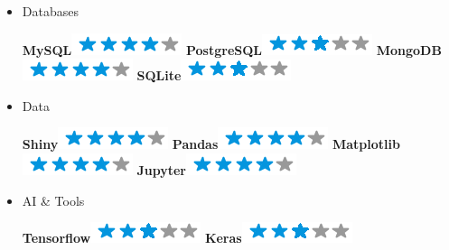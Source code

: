 \documentclass[]{friggeri-cv}
\begin{document}
\begin{flushright}
\begin{multicols}{3}
\begin{itemize}
\columnbreak
\item Databases \
\begin{flushright}

\textbf{MySQL}\includegraphics[scale=0.40]{res/img/4stars.png}
\textbf{PostgreSQL}\includegraphics[scale=0.40]{res/img/3stars.png}
\textbf{MongoDB}\includegraphics[scale=0.40]{res/img/4stars.png}
\textbf{SQLite}\includegraphics[scale=0.40]{res/img/3stars.png}
\end{flushright}            

\item Data \
\begin{flushright}

\textbf{Shiny}\includegraphics[scale=0.40]{res/img/4stars.png}
\textbf{Pandas}\includegraphics[scale=0.40]{res/img/4stars.png}
\textbf{Matplotlib}\includegraphics[scale=0.40]{res/img/4stars.png}
\textbf{Jupyter}\includegraphics[scale=0.40]{res/img/4stars.png}
\end{flushright}            

\item AI \& Tools \
\begin{flushright}

\textbf{Tensorflow}\includegraphics[scale=0.40]{res/img/3stars.png}
\textbf{Keras}\includegraphics[scale=0.40]{res/img/3stars.png}
\end{flushright}            


\end{itemize}
\end{multicols}
\end{flushright}
\end{document}
